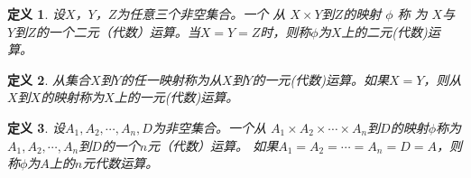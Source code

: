 \documentclass{article}
\newtheorem{Def}{定义}
\begin{document}
\begin{CJK*}{UTF8}{gbsn}
       



  \begin{Def}
    设$X$，$Y$，$Z$为任意三个非空集合。一个 从 $X\times Y$到$Z$的映射 $\phi$ 称 为 $X$与$Y$到$Z$的一个二元（代数）运算。当$X=Y=Z$时，则称$\phi$为$X$上的二元(代数)运算。
  \end{Def}
  \begin{Def}
    从集合$X$到$Y$的任一映射称为从$X$到$Y$的一元(代数)运算。如果$X=Y$，则从$X$到$X$的映射称为$X$上的一元(代数)运算。
  \end{Def}
  \begin{Def}
    设$A_1, A_2, \cdots, A_n, D$为非空集合。一个从 $A_1\times A_2\times \cdots \times A_n$到$D$的映射$\phi$称为$A_1, A_2, \cdots, A_n$到$D$的一个$n$元（代数）运算。
    如果$A_1=A_2=\cdots=A_n=D=A$，则称$\phi$为$A$上的$n$元代数运算。
  \end{Def}


\end{CJK*}
\end{document}
